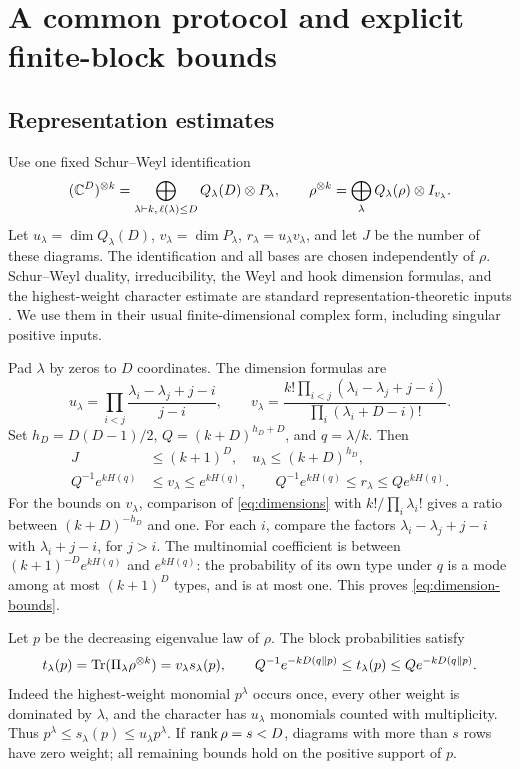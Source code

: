 \section{A common protocol and explicit finite-block bounds}\label{sec:universal}

\subsection{Representation estimates}
Use one fixed Schur--Weyl identification
\begin{equation}\label{eq:schur}
 (\mathbb C^D)^{\otimes k}=\bigoplus_{\lambda\vdash k,\,\ell(\lambda)\le D}
 Q_\lambda(D)\otimes P_\lambda,\qquad
 \rho^{\otimes k}=\bigoplus_\lambda Q_\lambda(\rho)\otimes I_{v_\lambda}.
\end{equation}
Let $u_\lambda=\dim Q_\lambda(D)$, $v_\lambda=\dim P_\lambda$, $r_\lambda=u_\lambda v_\lambda$, and let $J$ be the number of these diagrams. The identification and all bases are chosen independently of $\rho$. Schur--Weyl duality, irreducibility, the Weyl and hook dimension formulas, and the highest-weight character estimate are standard representation-theoretic inputs \cite{kw}. We use them in their usual finite-dimensional complex form, including singular positive inputs.

Pad $\lambda$ by zeros to $D$ coordinates. The dimension formulas are
\begin{equation}\label{eq:dimensions}
 u_\lambda=\prod_{i<j}\frac{\lambda_i-\lambda_j+j-i}{j-i},\qquad
 v_\lambda=\frac{k!\prod_{i<j}(\lambda_i-\lambda_j+j-i)}{\prod_i(\lambda_i+D-i)!}.
\end{equation}
Set $h_D=D(D-1)/2$, $Q=(k+D)^{h_D+D}$, and $q=\lambda/k$. Then
\begin{align}\label{eq:dimension-bounds}
 J&\le(k+1)^D,\quad u_\lambda\le(k+D)^{h_D},\nonumber\\
 Q^{-1}e^{kH(q)}&\le v_\lambda\le e^{kH(q)},\qquad
 Q^{-1}e^{kH(q)}\le r_\lambda\le Qe^{kH(q)}.
\end{align}
For the bounds on $v_\lambda$, comparison of \eqref{eq:dimensions} with $k!/\prod_i\lambda_i!$ gives a ratio between $(k+D)^{-h_D}$ and one. For each $i$, compare the factors $\lambda_i-\lambda_j+j-i$ with $\lambda_i+j-i$, for $j>i$. The multinomial coefficient is between $(k+1)^{-D}e^{kH(q)}$ and $e^{kH(q)}$: the probability of its own type under $q$ is a mode among at most $(k+1)^D$ types, and is at most one. This proves \eqref{eq:dimension-bounds}.

Let $p$ be the decreasing eigenvalue law of $\rho$. The block probabilities satisfy
\begin{equation}\label{eq:schur-probability}
 t_\lambda(p)=\operatorname{Tr}(\Pi_\lambda\rho^{\otimes k})=v_\lambda s_\lambda(p),
 \qquad Q^{-1}e^{-kD(q\|p)}\le t_\lambda(p)\le Qe^{-kD(q\|p)}.
\end{equation}
Indeed the highest-weight monomial $p^\lambda$ occurs once, every other weight is dominated by $\lambda$, and the character has $u_\lambda$ monomials counted with multiplicity. Thus $p^\lambda\le s_\lambda(p)\le u_\lambda p^\lambda$. If $\operatorname{rank}\rho=s<D$, diagrams with more than $s$ rows have zero weight; all remaining bounds hold on the positive support of $p$.

